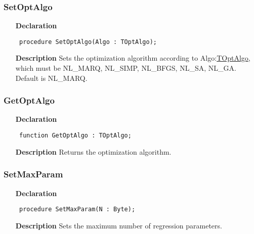 \documentclass[12pt,a4paper,oneside]{report}
\newcommand{\declarationitem}[1]{\textbf{#1}}
\newcommand{\descriptiontitle}[1]{\textbf{#1}}
\newcommand{\code}[1]{\texttt{#1}}
\begin{document}
\subsubsection{SetOptAlgo}
\label{unlfit-SetOptAlgo}
\begin{itemize}\item[\declarationitem{Declaration}\hfill]
	\begin{flushleft}
		\code{
			procedure SetOptAlgo(Algo : TOptAlgo);}
		
	\end{flushleft}
	
	\par
	\item[\descriptiontitle{Description}]
	Sets the optimization algorithm according to Algo:\hyperref[utypes-TOptAlgo]{TOptAlgo}, which must be NL{\_}MARQ, NL{\_}SIMP, NL{\_}BFGS, NL{\_}SA, NL{\_}GA. Default is NL{\_}MARQ.
	
\end{itemize}
\subsubsection{GetOptAlgo}
\label{unlfit-GetOptAlgo}
\begin{itemize}\item[\declarationitem{Declaration}\hfill]
	\begin{flushleft}
		\code{
			function GetOptAlgo : TOptAlgo;}
		
	\end{flushleft}
	
	\par
	\item[\descriptiontitle{Description}]
	Returns the optimization algorithm.
	
\end{itemize}
\subsubsection{SetMaxParam}
\label{unlfit-SetMaxParam}
\begin{itemize}\item[\declarationitem{Declaration}\hfill]
	\begin{flushleft}
		\code{
			procedure SetMaxParam(N : Byte);}
		
	\end{flushleft}
	
	\par
	\item[\descriptiontitle{Description}]
	Sets the maximum number of regression parameters.
	
\end{itemize}
\end{document}
